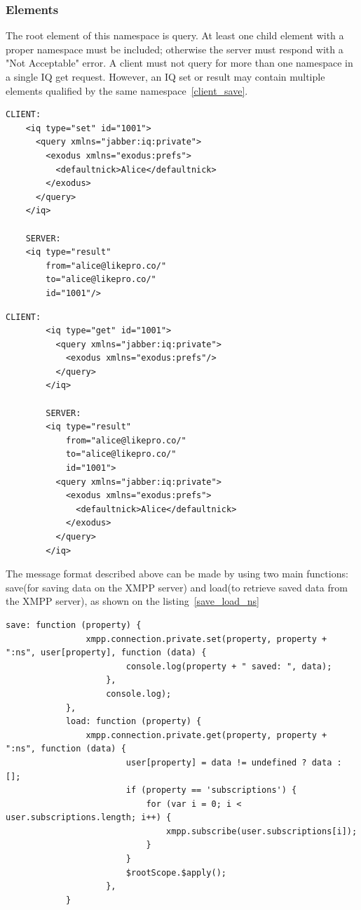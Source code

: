 	\subsubsection{Elements}
	The root element of this namespace is query. At least one child element with a proper namespace must be included; otherwise the server must respond with a "Not Acceptable" error. A client must not query for more than one namespace in a single IQ get request. However, an IQ set or result may contain multiple elements qualified by the same namespace~\ref{client_save}.
    \begin{lstlisting}[label=client_save,caption=Client Stores Private Data]
	CLIENT:
	<iq type="set" id="1001">
	  <query xmlns="jabber:iq:private">
	    <exodus xmlns="exodus:prefs">
	      <defaultnick>Alice</defaultnick>
	    </exodus>
	  </query>
	</iq>

	SERVER:
	<iq type="result"
	    from="alice@likepro.co/"
	    to="alice@likepro.co/"
	    id="1001"/>
    \end{lstlisting}

     \begin{lstlisting}[label=client_load,caption=Client Retrieves Private Data]
		CLIENT:
		<iq type="get" id="1001">
		  <query xmlns="jabber:iq:private">
		    <exodus xmlns="exodus:prefs"/>
		  </query>
		</iq>

		SERVER:
		<iq type="result"
		    from="alice@likepro.co/"
		    to="alice@likepro.co/"
		    id="1001">
		  <query xmlns="jabber:iq:private">
		    <exodus xmlns="exodus:prefs">
		      <defaultnick>Alice</defaultnick>
		    </exodus>
		  </query>
		</iq>
    \end{lstlisting}

    The message format described above can be made by using two main functions: save(for saving data on the XMPP server) and load(to retrieve saved data from the XMPP server), as shown on the listing~\ref{save_load_ns}
	\begin{lstlisting}[label=save_load_ns,caption=Snippet of Save/Load preferences to a private namespace]
	      	save: function (property) {
	            xmpp.connection.private.set(property, property + ":ns", user[property], function (data) {
	                    console.log(property + " saved: ", data);
	                },
	                console.log);
	        },
	        load: function (property) {
	            xmpp.connection.private.get(property, property + ":ns", function (data) {
	                    user[property] = data != undefined ? data : [];
	                    if (property == 'subscriptions') {
	                        for (var i = 0; i < user.subscriptions.length; i++) {
	                            xmpp.subscribe(user.subscriptions[i]);
	                        }
	                    }
	                    $rootScope.$apply();
	                },
	        }
	\end{lstlisting}

